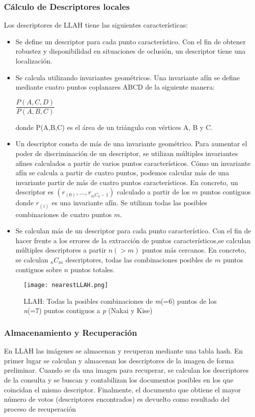 \subsubsection{Cálculo de Descriptores locales}
Los descriptores de LLAH tiene las siguientes características:
\begin{itemize}
\item Se define un descriptor para cada punto característico. Con el fin de obtener robustez y disponibilidad en situaciones de oclusión, un descriptor tiene una localización.
\item Se calcula utilizando invariantes geométricos. Una invariante afín se define mediante cuatro puntos coplanares ABCD de la siguiente manera:
  \begin{center}
    $ \dfrac{P(A,C,D)}{P(A,B,C)} $
  \end{center}
  donde P(A,B,C) es el área de un triángulo con vértices A, B y C.
\item Un descriptor consta de más de una invariante geométrico. Para aumentar el poder de discriminación de un descriptor, se utilizan múltiples invariantes afines calculados a partir de varios puntos característicos. Cómo un invariante afín se calcula a partir de cuatro puntos, podemos calcular más de una invariante partir de más de cuatro puntos característicos. En concreto, un descriptor es $(r_{(0)},...,r_{_{m}C_{4}-1})$ calculado a partir de los $m$ puntos contiguos donde $r_{(i)}$ es una invariante afín. Se utilizan todas las posibles combinaciones de cuatro puntos $m$.
\item Se calculan más de un descriptor para cada punto característico. Con el fin de hacer frente a los errores de la extracción de puntos característicos,se calculan múltiples descriptores a partir $n (>m)$ puntos más cercanos. En concreto, se calculan $_{n}C_{m}$ descriptores, todas las combinaciones posibles de $m$ puntos contiguos sobre $n$ puntos totales.
\end{itemize} 

\begin{figure}
  \centering
  \texttt{[image: nearestLLAH.png]}
  \caption{LLAH: Todas la posibles combinaciones de \textit{m}(=6) puntos de los \textit{n}(=7) puntos contiguos a \textit{p} (Nakai y Kise)}
  \label{fig:nearest}
\end{figure}

\subsubsection{Almacenamiento y Recuperación}
En LLAH las imágenes se almacenan y recuperan mediante una tabla hash. En primer lugar se calculan y almacenan los descriptores de la imagen de forma preliminar. Cuando se da una imagen para recuperar, se calculan los descriptores de la consulta y se buscan y contabilizan los documentos posibles en los que coincidan el mismo descriptor. Finalmente, el documento que obtiene el mayor número de votos (descriptores encontrados)  es devuelto como resultado del proceso de recuperación


